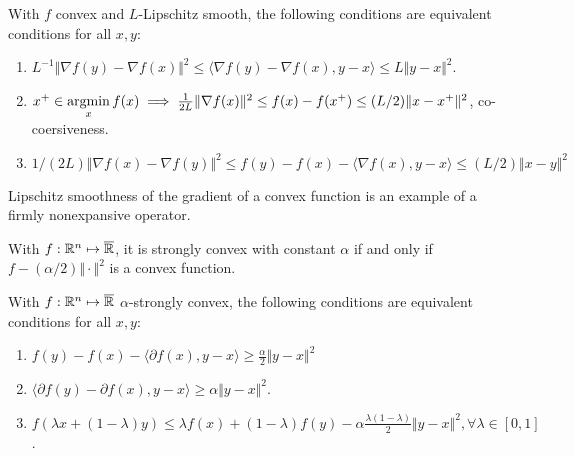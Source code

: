\documentclass[12pt]{article}
\begin{document}
        \begin{theorem}
            With $f$ convex and $L$-Lipschitz smooth, the following conditions are equivalent conditions for all $x, y$: 
            \begin{enumerate}
                \item $L^{-1}\Vert \nabla f(y) - \nabla f(x)\Vert^2 \le \langle \nabla f(y) - \nabla f(x), y - x\rangle \le L\Vert y - x\Vert^2$. 
                \item $x^+\in \mathop{\rm argmin}\limits_x f(x) \implies \frac{1}{2L}\Vert \nabla f(x)\Vert^2 \le f(x) - f(x^+) \le (L/2) \Vert x - x^+\Vert^2$, co-coersiveness. 
                \item $ 1/(2L)\Vert \nabla f(x) - \nabla f(y)\Vert^2 \le  f(y) - f(x) - \langle \nabla f(x), y -x\rangle \le (L/2)\Vert x - y\Vert^2$
            \end{enumerate}    
        \end{theorem}
        \begin{remark}
            Lipschitz smoothness of the gradient of a convex function is an example of a firmly nonexpansive operator.  
        \end{remark}

        \begin{definition}
            With $f: \mathbb R^n \mapsto \overline {\mathbb R}$, it is strongly convex with constant $\alpha$ if and only if $f - (\alpha/2)\Vert \cdot\Vert^2$ is a convex function. 
        \end{definition}
        
        \begin{theorem}\label{thm:str_cvx_equiv}
            With $f:\mathbb R^n \mapsto \overline {\mathbb R}$ $\alpha$-strongly convex, the following conditions are equivalent conditions for all $x, y$: 
            \begin{enumerate}
                \item $f(y) - f(x) - \langle \partial f(x),y - x \rangle\ge \frac{\alpha}{2}\Vert y - x\Vert^2$
                \item $\langle \partial f(y) - \partial f(x), y - x\rangle \ge \alpha\Vert y - x\Vert^2$. 
                \item $f(\lambda x + (1 - \lambda)y) \le \lambda f(x) + (1 - \lambda)f(y) -\alpha\frac{\lambda(1 - \lambda)}{2}\Vert y - x\Vert^2, \forall \lambda \in [0, 1]$. 
            \end{enumerate}
        \end{theorem}
\end{document}

